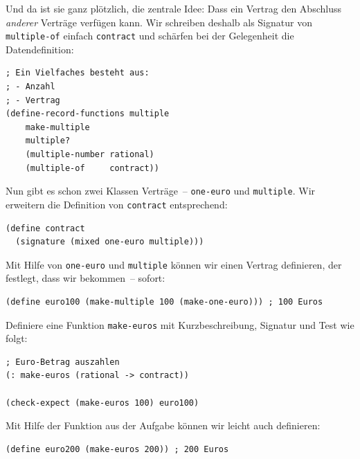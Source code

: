 Und da ist sie ganz plötzlich, die zentrale Idee: Dass ein Vertrag den
Abschluss \emph{anderer} Verträge verfügen kann.  Wir schreiben
deshalb als Signatur von \lstinline{multiple-of} einfach
\lstinline{contract} und schärfen bei der Gelegenheit die Datendefinition:
%
\begin{lstlisting}
; Ein Vielfaches besteht aus:
; - Anzahl
; - Vertrag 
(define-record-functions multiple
    make-multiple
    multiple?
    (multiple-number rational)
    (multiple-of     contract))
\end{lstlisting}
%
Nun gibt es schon zwei Klassen Verträge~-- \lstinline{one-euro} und
\lstinline{multiple}.  Wir erweitern die Definition von
\lstinline{contract} entsprechend:
%
\begin{lstlisting}
(define contract
  (signature (mixed one-euro multiple)))
\end{lstlisting}
%
Mit Hilfe von \lstinline{one-euro} und \lstinline{multiple} können wir
einen Vertrag definieren, der festlegt, dass wir  bekommen~--
sofort:
%
\begin{lstlisting}
(define euro100 (make-multiple 100 (make-one-euro))) ; 100 Euros
\end{lstlisting}
%
\begin{aufgabeinline}
  Definiere eine Funktion \lstinline{make-euros} mit Kurzbeschreibung,
  Signatur und Test wie folgt:
\begin{lstlisting}
; Euro-Betrag auszahlen
(: make-euros (rational -> contract))

(check-expect (make-euros 100) euro100)
\end{lstlisting}
\end{aufgabeinline}
%
Mit Hilfe der Funktion aus der Aufgabe können wir leicht auch
 definieren:
%
\begin{lstlisting}
(define euro200 (make-euros 200)) ; 200 Euros
\end{lstlisting}

